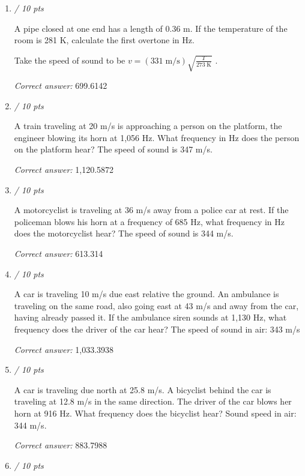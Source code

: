 \documentclass[11pt]{article}
\begin{document}
\begin{enumerate}[leftmargin=*,label=\textbf{Question \arabic*.}]
Take the speed of sound to be $v=(331\;\mathrm{m/s})\sqrt{\frac{T}{273\;\mathrm{K}}}$ .

\textit{Correct answer: } 424.2263

\item \hfill \textit{/ 10 pts}

A pipe closed at one end has a length of 0.36 m. If the temperature of the room is 281 K, calculate the first overtone in Hz.

Take the speed of sound to be $v=(331\;\mathrm{m/s})\sqrt{\frac{T}{273\;\mathrm{K}}}$ .

\textit{Correct answer: } 699.6142

\item \hfill \textit{/ 10 pts}

A train traveling at 20 m/s is approaching a person on the platform, the engineer blowing its horn at 1,056 Hz. What frequency in Hz does the person on the platform hear? The speed of sound is 347 m/s.

\textit{Correct answer: } 1,120.5872

\item \hfill \textit{/ 10 pts}

A motorcyclist is traveling at 36 m/s away from a police car at rest. If the policeman blows his horn at a frequency of 685 Hz, what frequency in Hz does the motorcyclist hear? The speed of sound is 344 m/s.

\textit{Correct answer: } 613.314

\item \hfill \textit{/ 10 pts}

A car is traveling 10 m/s due east relative the ground. An ambulance is traveling on the same road, also going east at 43 m/s and away from the car, having already passed it. If the ambulance siren sounds at 1,130 Hz, what frequency does the driver of the car hear? The speed of sound in air: 343 m/s

\textit{Correct answer: } 1,033.3938

\item \hfill \textit{/ 10 pts}

A car is traveling due north at 25.8 m/s. A bicyclist behind the car is traveling at 12.8 m/s in the same direction. The driver of the car blows her horn at 916 Hz. What frequency does the bicyclist hear? Sound speed in air: 344 m/s.

\textit{Correct answer: } 883.7988

\item \hfill \textit{/ 10 pts}


\end{enumerate}
\end{document}
